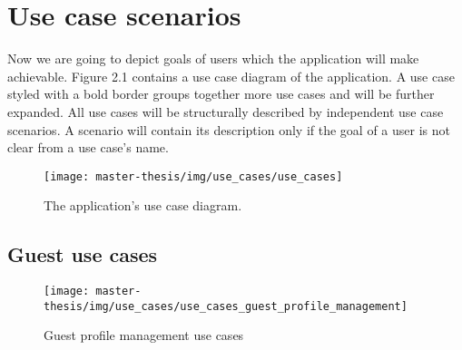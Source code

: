 \section{Use case scenarios}
Now we are going to depict goals of users which the application will make achievable.
Figure 2.1 contains a use case diagram of the application.
A use case styled with a bold border groups together more use cases and will be further expanded.
All use cases will be structurally described by independent use case scenarios.
A scenario will contain its description only if the goal of a user is not clear from a use case's name.

\begin{figure}[h]
  \texttt{[image: master-thesis/img/use\_cases/use\_cases]}
  \caption{The application's use case diagram.}
\end{figure}

\newpage

\def\arraystretch{1.5}

\subsection{Guest use cases}

\begin{figure}[h]
  \centering
  \texttt{[image: master-thesis/img/use\_cases/use\_cases\_guest\_profile\_management]}
  \caption{Guest profile management use cases}
\end{figure}

\newpage

